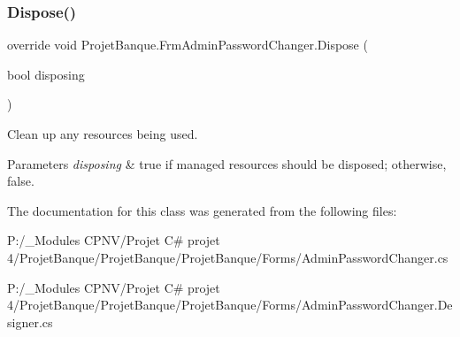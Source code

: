 \subsubsection{\texorpdfstring{Dispose()}{Dispose()}}
{\footnotesize\ttfamily override void Projet\+Banque.\+Frm\+Admin\+Password\+Changer.\+Dispose (\begin{DoxyParamCaption}\item[{bool}]{disposing }\end{DoxyParamCaption})\hspace{0.3cm}{\ttfamily [protected]}}



Clean up any resources being used. 


\begin{DoxyParams}{Parameters}
{\em disposing} & true if managed resources should be disposed; otherwise, false.\\
\hline
\end{DoxyParams}


The documentation for this class was generated from the following files\+:\begin{DoxyCompactItemize}
\item 
P\+:/\+\_\+\+Modules C\+P\+N\+V/\+Projet C\# projet 4/\+Projet\+Banque/\+Projet\+Banque/\+Projet\+Banque/\+Forms/Admin\+Password\+Changer.\+cs\item 
P\+:/\+\_\+\+Modules C\+P\+N\+V/\+Projet C\# projet 4/\+Projet\+Banque/\+Projet\+Banque/\+Projet\+Banque/\+Forms/Admin\+Password\+Changer.\+Designer.\+cs\end{DoxyCompactItemize}
